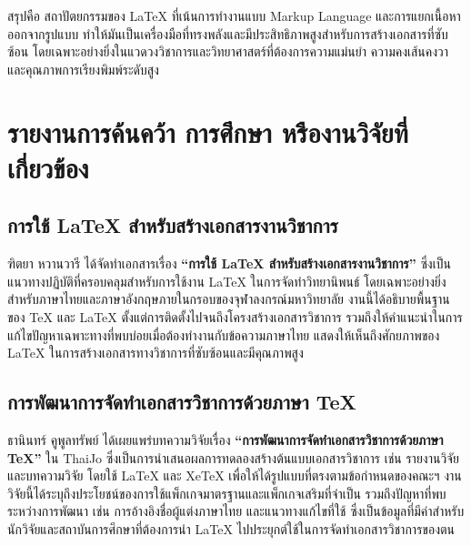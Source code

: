 \hspace*{1.5em} %
สรุปคือ สถาปัตยกรรมของ LaTeX ที่เน้นการทำงานแบบ Markup Language และการแยกเนื้อหาออกจากรูปแบบ ทำให้มันเป็นเครื่องมือที่ทรงพลังและมีประสิทธิภาพสูงสำหรับการสร้างเอกสารที่ซับซ้อน โดยเฉพาะอย่างยิ่งในแวดวงวิชาการและวิทยาศาสตร์ที่ต้องการความแม่นยำ ความคงเส้นคงวา และคุณภาพการเรียงพิมพ์ระดับสูง \parencite{overleaflearn}






\section{รายงานการค้นคว้า การศึกษา หรืองานวิจัยที่เกี่ยวข้อง}

\subsection{การใช้ LaTeX สำหรับสร้างเอกสารงานวิชาการ}
\hspace*{1.5em} %
ฑิตยา หวานวารี ได้จัดทำเอกสารเรื่อง \textbf{“การใช้ LaTeX สำหรับสร้างเอกสารงานวิชาการ”} ซึ่งเป็นแนวทางปฏิบัติที่ครอบคลุมสำหรับการใช้งาน LaTeX ในการจัดทำวิทยานิพนธ์ โดยเฉพาะอย่างยิ่งสำหรับภาษาไทยและภาษาอังกฤษภายในกรอบของจุฬาลงกรณ์มหาวิทยาลัย งานนี้ได้อธิบายพื้นฐานของ TeX และ LaTeX ตั้งแต่การติดตั้งไปจนถึงโครงสร้างเอกสารวิชาการ รวมถึงให้คำแนะนำในการแก้ไขปัญหาเฉพาะทางที่พบบ่อยเมื่อต้องทำงานกับข้อความภาษาไทย แสดงให้เห็นถึงศักยภาพของ LaTeX ในการสร้างเอกสารทางวิชาการที่ซับซ้อนและมีคุณภาพสูง \parencite{wanwaree2023}

\subsection{การพัฒนาการจัดทำเอกสารวิชาการด้วยภาษา TeX}
\hspace*{1.5em} %
ธานินทร์ คูพูลทรัพย์ ได้เผยแพร่บทความวิจัยเรื่อง \textbf{“การพัฒนาการจัดทำเอกสารวิชาการด้วยภาษา TeX”} ใน ThaiJo ซึ่งเป็นการนำเสนอผลการทดลองสร้างต้นแบบเอกสารวิชาการ เช่น รายงานวิจัยและบทความวิจัย โดยใช้ LaTeX และ XeTeX เพื่อให้ได้รูปแบบที่ตรงตามข้อกำหนดของคณะฯ งานวิจัยนี้ได้ระบุถึงประโยชน์ของการใช้แพ็กเกจมาตรฐานและแพ็กเกจเสริมที่จำเป็น รวมถึงปัญหาที่พบระหว่างการพัฒนา เช่น การอ้างอิงชื่อผู้แต่งภาษาไทย และแนวทางแก้ไขที่ใช้ ซึ่งเป็นข้อมูลที่มีค่าสำหรับนักวิจัยและสถาบันการศึกษาที่ต้องการนำ LaTeX ไปประยุกต์ใช้ในการจัดทำเอกสารวิชาการของตน \parencite{lampangrajabhat2013}

